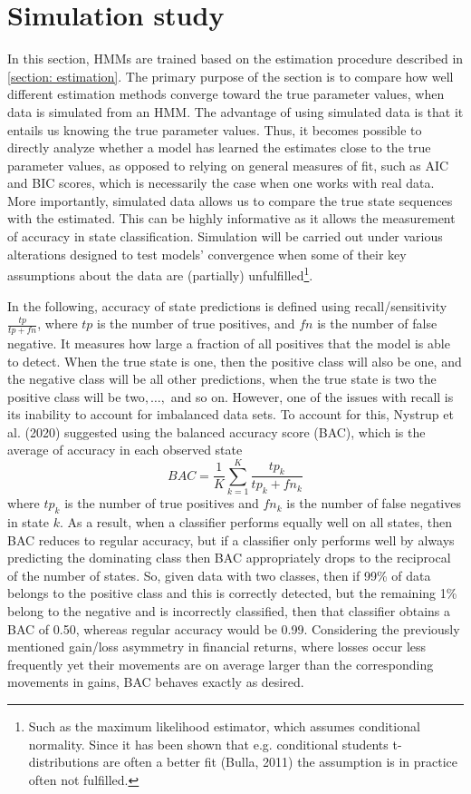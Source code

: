 \newpage

\section{Simulation study}
In this section, HMMs are trained based on the estimation procedure described in \ref{section: estimation}. The primary purpose of the section is to compare how well different estimation methods converge toward the true parameter values, when data is simulated from an HMM. The advantage of using simulated data is that it entails us knowing the true parameter values. Thus, it becomes possible to directly analyze whether a model has learned the estimates close to the true parameter values, as opposed to relying on general measures of fit, such as AIC and BIC scores, which is necessarily the case when one works with real data. More importantly, simulated data allows us to compare the true state sequences with the estimated. This can be highly informative as it allows the measurement of accuracy in state classification. Simulation will be carried out under various alterations designed to test models' convergence when some of their key assumptions about the data are (partially) unfulfilled\footnote
{Such as the maximum likelihood estimator, which assumes conditional normality. Since it has been shown that e.g. conditional students t-distributions are often a better fit (Bulla, 2011) the assumption is in practice often not fulfilled.
}.

In the following, accuracy of state predictions is defined using recall/sensitivity $\frac{tp}{tp+fn}$, where $tp$ is the number of true positives, and $fn$ is the number of false negative. It measures how large a fraction of all positives that the model is able to detect. When the true state is one, then the positive class will also be one, and the negative class will be all other predictions, when the true state is two the positive class will be two$,\ldots,$ and so on. However, one of the issues with recall is its inability to account for imbalanced data sets. To account for this, Nystrup et al. (2020) suggested using the balanced accuracy score (BAC), which is the average of accuracy in each observed state
\begin{equation}
    BAC = \frac{1}{K} \sum_{k=1}^K \frac{tp_k}{tp_k + fn_k}
    \label{eq: BAC definition}
\end{equation}
where $tp_k$ is the number of true positives and $fn_k$ is the number of false negatives in state $k$. As a result, when a classifier performs equally well on all states, then BAC reduces to regular accuracy, but if a classifier only performs well by always predicting the dominating class then BAC appropriately drops to the reciprocal of the number of states. So, given data with two classes, then if 99\% of data belongs to the positive class and this is correctly detected, but the remaining 1\% belong to the negative and is incorrectly classified, then that classifier obtains a BAC of 0.50, whereas regular accuracy would be 0.99. Considering the previously mentioned gain/loss asymmetry in financial returns, where losses occur less frequently yet their movements are on average larger than the corresponding movements in gains, BAC behaves exactly as desired.

